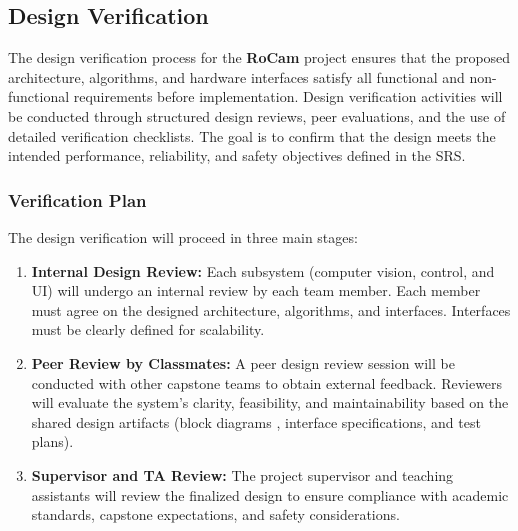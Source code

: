 \documentclass[12pt, titlepage]{article}
\begin{document}


\subsection{Design Verification}

The design verification process for the \textbf{RoCam} project ensures that 
the proposed architecture, algorithms, and hardware interfaces satisfy all 
functional and non-functional requirements before implementation. 
Design verification activities will be conducted through structured design 
reviews, peer evaluations, and the use of detailed verification checklists. 
The goal is to confirm that the design meets the intended performance, 
reliability, and safety objectives defined in the SRS.

\subsubsection*{Verification Plan}
The design verification will proceed in three main stages:
\begin{enumerate}
    \item \textbf{Internal Design Review:}  
    Each subsystem (computer vision, control, and UI) 
    will undergo an internal review by each team member. Each member must
    agree on the designed architecture, algorithms, and interfaces.
    Interfaces must be clearly defined for scalability.

    
    \item \textbf{Peer Review by Classmates:}  
    A peer design review session will be conducted with other capstone 
    teams to obtain external feedback.  
    Reviewers will evaluate the system’s clarity, feasibility, and 
    maintainability based on the shared design artifacts (block diagrams
    , interface specifications, and test plans).

    \item \textbf{Supervisor and TA Review:}  
    The project supervisor and teaching assistants will review the 
    finalized design to ensure compliance with academic standards, 
    capstone expectations, and safety considerations.
\end{enumerate}
\end{document}
